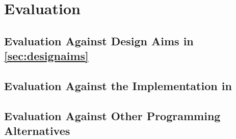 \cleardoublepage
\chapter{Evaluation}
\label{ch:evaluation}

\section{Evaluation Against Design Aims in \autoref{sec:designaims}}

\section{Evaluation Against the Implementation in \cite{sess_type_guided_distr_interact}}

\section{Evaluation Against Other Programming Alternatives}